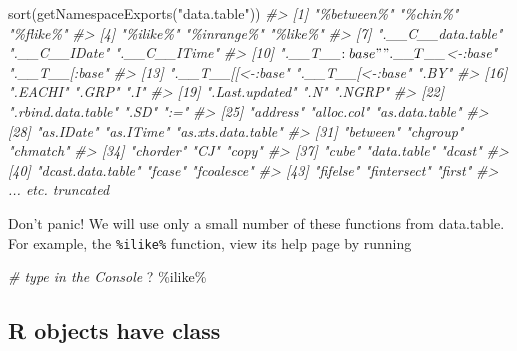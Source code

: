 \documentclass[
]{book}
\newenvironment{Shaded}{\begin{snugshade}}{\end{snugshade}}
\newcommand{\AttributeTok}[1]{\textcolor[rgb]{0.77,0.63,0.00}{#1}}
\newcommand{\CommentTok}[1]{\textcolor[rgb]{0.56,0.35,0.01}{\textit{#1}}}
\newcommand{\FunctionTok}[1]{\textcolor[rgb]{0.00,0.00,0.00}{#1}}
\newcommand{\NormalTok}[1]{#1}
\newcommand{\StringTok}[1]{\textcolor[rgb]{0.31,0.60,0.02}{#1}}
\begin{document}
\begin{Shaded}
\begin{Highlighting}[]
\FunctionTok{sort}\NormalTok{(}\FunctionTok{getNamespaceExports}\NormalTok{(}\StringTok{"data.table"}\NormalTok{))}
\CommentTok{\#\textgreater{}   [1] "\%between\%"          "\%chin\%"             "\%flike\%"           }
\CommentTok{\#\textgreater{}   [4] "\%ilike\%"            "\%inrange\%"          "\%like\%"            }
\CommentTok{\#\textgreater{}   [7] ".\_\_C\_\_data.table"   ".\_\_C\_\_IDate"        ".\_\_C\_\_ITime"       }
\CommentTok{\#\textgreater{}  [10] ".\_\_T\_\_$:base"       ".\_\_T\_\_$\textless{}{-}:base"     ".\_\_T\_\_[:base"      }
\CommentTok{\#\textgreater{}  [13] ".\_\_T\_\_[[\textless{}{-}:base"    ".\_\_T\_\_[\textless{}{-}:base"     ".BY"               }
\CommentTok{\#\textgreater{}  [16] ".EACHI"             ".GRP"               ".I"                }
\CommentTok{\#\textgreater{}  [19] ".Last.updated"      ".N"                 ".NGRP"             }
\CommentTok{\#\textgreater{}  [22] ".rbind.data.table"  ".SD"                ":="                }
\CommentTok{\#\textgreater{}  [25] "address"            "alloc.col"          "as.data.table"     }
\CommentTok{\#\textgreater{}  [28] "as.IDate"           "as.ITime"           "as.xts.data.table" }
\CommentTok{\#\textgreater{}  [31] "between"            "chgroup"            "chmatch"           }
\CommentTok{\#\textgreater{}  [34] "chorder"            "CJ"                 "copy"              }
\CommentTok{\#\textgreater{}  [37] "cube"               "data.table"         "dcast"             }
\CommentTok{\#\textgreater{}  [40] "dcast.data.table"   "fcase"              "fcoalesce"         }
\CommentTok{\#\textgreater{}  [43] "fifelse"            "fintersect"         "first"   }
\CommentTok{\#\textgreater{}  ... etc. truncated}
\end{Highlighting}
\end{Shaded}

Don't panic! We will use only a small number of these functions from data.table. For example, the \texttt{\%ilike\%} function, view its help page by running

\begin{Shaded}
\begin{Highlighting}[]
\CommentTok{\# type in the Console}
\NormalTok{? }\StringTok{\textasciigrave{}}\AttributeTok{\%ilike\%}\StringTok{\textasciigrave{}} 
\end{Highlighting}
\end{Shaded}

\hypertarget{r-objects-have-class}{%
\subsection{R objects have class}\label{r-objects-have-class}}
\end{document}
